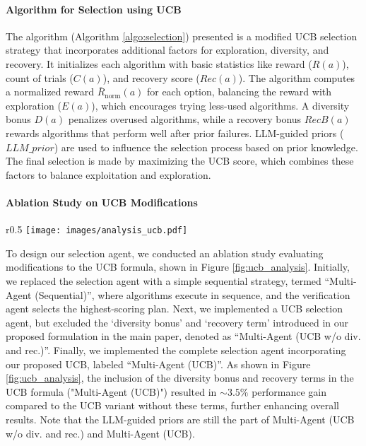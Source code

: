 \paragraph{Algorithm for Selection using UCB}

The algorithm (Algorithm \ref{algo:selection}) presented is a modified UCB selection strategy that incorporates additional factors for exploration, diversity, and recovery. It initializes each algorithm with basic statistics like reward ($R(a)$), count of trials ($C(a)$), and recovery score ($Rec(a)$). The algorithm computes a normalized reward $\bar{R}_{\text{norm}}(a)$ for each option, balancing the reward with exploration ($E(a)$), which encourages trying less-used algorithms. A diversity bonus $D(a)$ penalizes overused algorithms, while a recovery bonus $RecB(a)$ rewards algorithms that perform well after prior failures. LLM-guided priors ($LLM\_prior$) are used to influence the selection process based on prior knowledge. The final selection is made by maximizing the UCB score, which combines these factors to balance exploitation and exploration.

\paragraph{Ablation Study on UCB Modifications}
\begin{wrapfigure}{r}{0.5\textwidth}
    \centering
    \vspace{-9mm}
    \texttt{[image: images/analysis\_ucb.pdf]}
    \caption{Ablation Study of UCB Modifications on Selection Agent and its impact on Multi-Agent Mixture of Algorithms framework. div.: diversity bonus, rec: recovery term.}
    \label{fig:ucb_analysis}
\end{wrapfigure}
To design our selection agent, we conducted an ablation study evaluating modifications to the UCB formula, shown in Figure \ref{fig:ucb_analysis}.  Initially, we replaced the selection agent with a simple sequential strategy, termed ``Multi-Agent (Sequential)'', where algorithms execute in sequence, and the verification agent selects the highest-scoring plan.  Next, we implemented a UCB selection agent, but excluded the `diversity bonus' and `recovery term' introduced in our proposed formulation in the main paper, denoted as ``Multi-Agent (UCB w/o div. and rec.)''. Finally, we implemented the complete selection agent incorporating our proposed UCB, labeled ``Multi-Agent (UCB)''.  As shown in Figure \ref{fig:ucb_analysis}, the inclusion of the diversity bonus and recovery terms in the UCB formula ("Multi-Agent (UCB)") resulted in $\sim3.5\%$ performance gain compared to the UCB variant without these terms, further enhancing overall results. Note that the LLM-guided priors are still the part of Multi-Agent (UCB w/o div. and rec.) and Multi-Agent (UCB).

